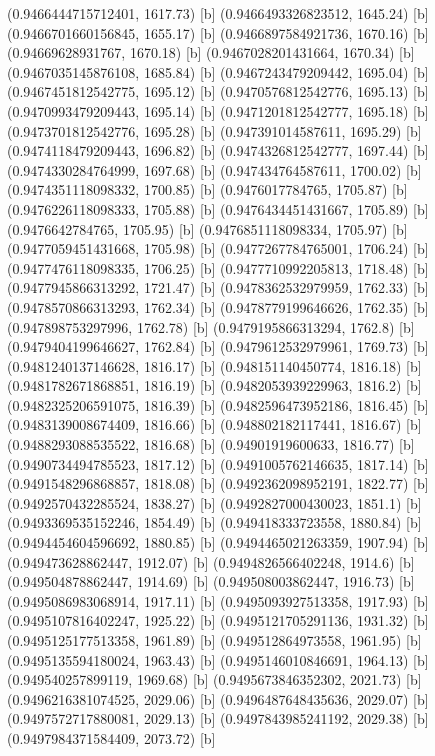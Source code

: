 {{{(0.9466444715712401, 1617.73) [b] 
(0.9466493326823512, 1645.24) [b] 
(0.9466701660156845, 1655.17) [b] 
(0.9466897584921736, 1670.16) [b] 
(0.94669628931767, 1670.18) [b] 
(0.9467028201431664, 1670.34) [b] 
(0.9467035145876108, 1685.84) [b] 
(0.9467243479209442, 1695.04) [b] 
(0.9467451812542775, 1695.12) [b] 
(0.9470576812542776, 1695.13) [b] 
(0.9470993479209443, 1695.14) [b] 
(0.9471201812542777, 1695.18) [b] 
(0.9473701812542776, 1695.28) [b] 
(0.947391014587611, 1695.29) [b] 
(0.9474118479209443, 1696.82) [b] 
(0.9474326812542777, 1697.44) [b] 
(0.9474330284764999, 1697.68) [b] 
(0.947434764587611, 1700.02) [b] 
(0.9474351118098332, 1700.85) [b] 
(0.9476017784765, 1705.87) [b] 
(0.9476226118098333, 1705.88) [b] 
(0.9476434451431667, 1705.89) [b] 
(0.9476642784765, 1705.95) [b] 
(0.9476851118098334, 1705.97) [b] 
(0.9477059451431668, 1705.98) [b] 
(0.9477267784765001, 1706.24) [b] 
(0.9477476118098335, 1706.25) [b] 
(0.9477710992205813, 1718.48) [b] 
(0.9477945866313292, 1721.47) [b] 
(0.9478362532979959, 1762.33) [b] 
(0.9478570866313293, 1762.34) [b] 
(0.9478779199646626, 1762.35) [b] 
(0.947898753297996, 1762.78) [b] 
(0.9479195866313294, 1762.8) [b] 
(0.9479404199646627, 1762.84) [b] 
(0.9479612532979961, 1769.73) [b] 
(0.9481240137146628, 1816.17) [b] 
(0.948151140450774, 1816.18) [b] 
(0.9481782671868851, 1816.19) [b] 
(0.9482053939229963, 1816.2) [b] 
(0.9482325206591075, 1816.39) [b] 
(0.9482596473952186, 1816.45) [b] 
(0.9483139008674409, 1816.66) [b] 
(0.948802182117441, 1816.67) [b] 
(0.9488293088535522, 1816.68) [b] 
(0.94901919600633, 1816.77) [b] 
(0.9490734494785523, 1817.12) [b] 
(0.9491005762146635, 1817.14) [b] 
(0.9491548296868857, 1818.08) [b] 
(0.9492362098952191, 1822.77) [b] 
(0.9492570432285524, 1838.27) [b] 
(0.9492827000430023, 1851.1) [b] 
(0.9493369535152246, 1854.49) [b] 
(0.949418333723558, 1880.84) [b] 
(0.9494454604596692, 1880.85) [b] 
(0.9494465021263359, 1907.94) [b] 
(0.949473628862447, 1912.07) [b] 
(0.9494826566402248, 1914.6) [b] 
(0.949504878862447, 1914.69) [b] 
(0.949508003862447, 1916.73) [b] 
(0.9495086983068914, 1917.11) [b] 
(0.9495093927513358, 1917.93) [b] 
(0.9495107816402247, 1925.22) [b] 
(0.9495121705291136, 1931.32) [b] 
(0.9495125177513358, 1961.89) [b] 
(0.949512864973558, 1961.95) [b] 
(0.9495135594180024, 1963.43) [b] 
(0.9495146010846691, 1964.13) [b] 
(0.949540257899119, 1969.68) [b] 
(0.9495673846352302, 2021.73) [b] 
(0.9496216381074525, 2029.06) [b] 
(0.9496487648435636, 2029.07) [b] 
(0.9497572717880081, 2029.13) [b] 
(0.9497843985241192, 2029.38) [b] 
(0.9497984371584409, 2073.72) [b] 
}}}
